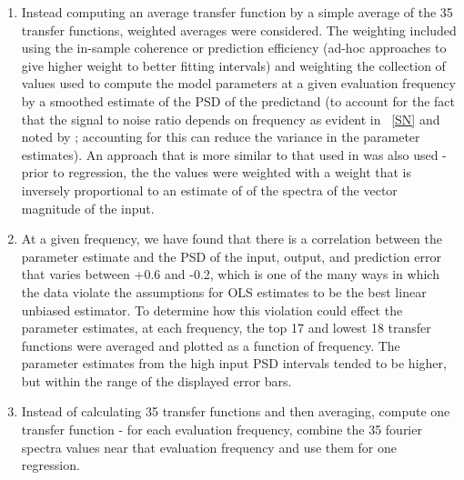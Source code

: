 \documentclass[draft,linenumbers]{agujournal2018}
\begin{document}
\begin{enumerate}
\item Instead computing an average transfer function by a simple average of the 35 transfer functions, weighted averages were considered. The weighting included using the in-sample coherence or prediction efficiency (ad-hoc approaches to give higher weight to better fitting intervals) and weighting the collection of values used to compute the model parameters at a given evaluation frequency by a smoothed estimate of the PSD of the predictand (to account for the fact that the signal to noise ratio depends on frequency as evident in ~\ref{SN} and noted by \citep{Egbert1997}; accounting for this can reduce the variance in the parameter estimates). An approach that is more similar to that used in \citep{Egbert1997} was also used - prior to regression, the the values were weighted with a weight that is inversely proportional to an estimate of of the spectra of the vector magnitude of the input. 

\item At a given frequency, we have found that there is a correlation between the parameter estimate and the PSD of the input, output, and prediction error that varies between +0.6 and -0.2, which is one of the many ways in which the data violate the assumptions for OLS estimates to be the best linear unbiased estimator. To determine how this violation could effect the parameter estimates, at each frequency, the top 17 and lowest 18 transfer functions were averaged and plotted as a function of frequency. The parameter estimates from the high input PSD intervals tended to be higher, but within the range of the displayed error bars.

\item Instead of calculating 35 transfer functions and then averaging, compute one transfer function - for each evaluation frequency, combine the 35 fourier spectra values near that evaluation frequency and use them for one regression.  
\end{enumerate}

\end{document}
